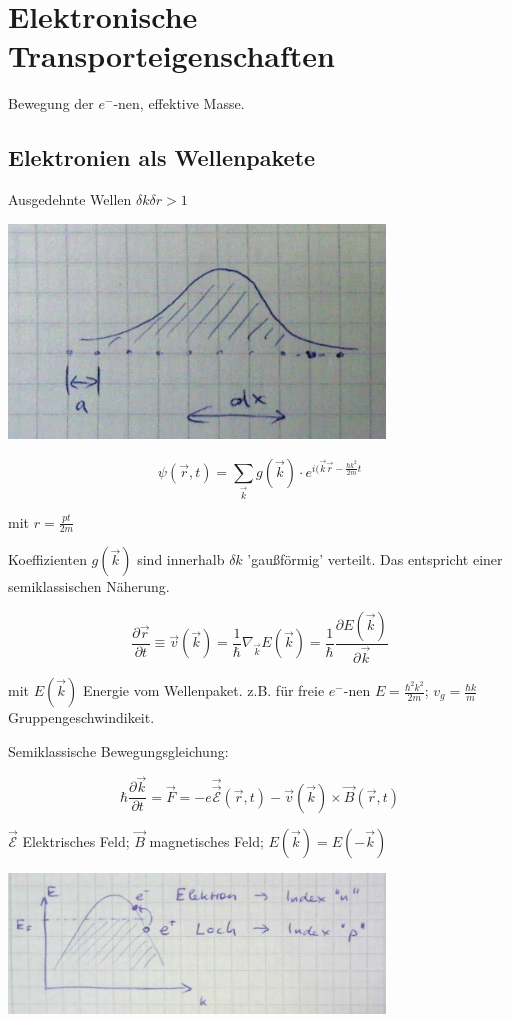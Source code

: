 \chapter{Elektronische Transporteigenschaften}

Bewegung der \(e^-\)-nen, effektive Masse.

\section{Elektronien als Wellenpakete}

Ausgedehnte Wellen \(\delta k\delta r > 1\)

\includegraphics[width=0.75\textwidth]{kap10_01.png}

\[\psi(\vec r,t) = \sum_{\vec k} g(\vec k)\cdot e^{i(\vec k\vec r - \frac{\hbar k^2}{2m}t}\]

mit \(r= \frac{pt}{2m}\)

Koeffizienten \(g(\vec k)\) sind innerhalb \(\delta k\) 'gaußförmig' verteilt. Das entspricht einer semiklassischen Näherung. 

\[\frac{\partial \vec r}{\partial t} \equiv \vec v(\vec k) = \frac{1}{\hbar}\nabla_{\vec k}E(\vec k) = \frac{1}{\hbar} \frac{\partial E(\vec k)}{\partial \vec k} \]

mit \(E(\vec k) \) Energie vom Wellenpaket. z.B. für freie \(e^-\)-nen \(E=\frac{\hbar^2 k^2}{2m}\); \(v_g=\frac{\hbar k}{m}\) Gruppengeschwindikeit.

Semiklassische Bewegungsgleichung:

\[\hbar \frac{\partial \vec k}{\partial t}=\vec F = -e\vec \vec{ \mathcal E}(\vec r,t) -\vec v(\vec k)\times \vec B(\vec r,t)  \]

\(\vec{ \mathcal E}\) Elektrisches Feld; \(\vec B\) magnetisches Feld; \(E(\vec k) = E(-\vec k)\)

\includegraphics[width=0.75\textwidth]{kap10_02.png}

